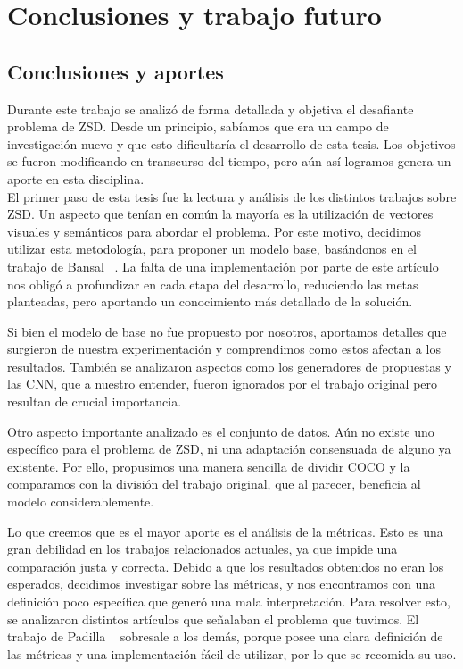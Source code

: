 \chapter{Conclusiones y trabajo futuro} \label{cap:conclusiones}

\section{Conclusiones y aportes} \label{sec:conclusionesyaportes}
Durante este trabajo se analizó de forma detallada y objetiva el desafiante problema de ZSD. Desde un principio, sabíamos que era un campo de investigación nuevo y que esto dificultaría el desarrollo de esta tesis. Los objetivos se fueron modificando en transcurso del tiempo, pero aún así logramos genera un aporte en esta disciplina.\\

El primer paso de esta tesis fue la lectura y análisis de los distintos trabajos sobre ZSD. Un aspecto que tenían en común la mayoría es la utilización de vectores visuales y semánticos para abordar el problema. Por este motivo, decidimos utilizar esta metodología, para proponer un modelo base, basándonos en el trabajo de Bansal \etal~\cite{bansal2018zero}. La falta de una implementación por parte de este artículo nos obligó a profundizar en cada etapa del desarrollo, reduciendo las metas planteadas, pero aportando un conocimiento más detallado de la solución. 

Si bien el modelo de base no fue propuesto por nosotros, aportamos detalles que surgieron de nuestra experimentación y comprendimos como estos afectan a los resultados. También se analizaron aspectos como los generadores de propuestas y las CNN, que a nuestro entender, fueron ignorados por el trabajo original pero resultan de crucial importancia.

Otro aspecto importante analizado es el conjunto de datos. Aún no existe uno específico para el problema de ZSD, ni una adaptación consensuada de alguno ya existente. Por ello, propusimos una manera sencilla de dividir COCO y la comparamos con la división del trabajo original, que al parecer, beneficia al modelo considerablemente.

Lo que creemos que es el mayor aporte es el análisis de la métricas. Esto es una gran debilidad en los trabajos relacionados actuales, ya que impide una comparación justa y correcta. 
Debido a que los resultados obtenidos no eran los esperados, decidimos investigar sobre las métricas, y nos encontramos con una definición poco específica que generó una mala interpretación. Para resolver esto, se analizaron distintos artículos que señalaban el problema que tuvimos. El trabajo de Padilla \etal~\cite{padilla2020survey} sobresale a los demás, porque posee una clara definición de las métricas y una implementación fácil de utilizar, por lo que se recomida su uso.

